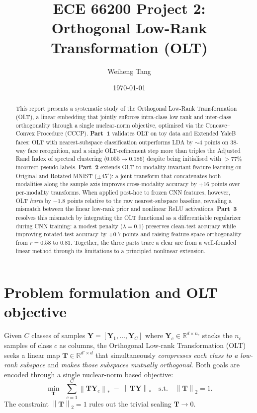 \documentclass[10pt]{article}
\title{ECE 66200 Project 2:\\
Orthogonal Low-Rank Transformation (OLT)}
\author{Weiheng Tang}
\date{\today}
\newcommand{\T}{\mathbf{T}}
\newcommand{\Y}{\mathbf{Y}}
\newcommand{\nuc}[1]{\left\|#1\right\|_{\ast}}
\newcommand{\spn}[1]{\left\|#1\right\|_{2}}
\begin{document}
\maketitle

\begin{abstract}
This report presents a systematic study of the Orthogonal Low-Rank
Transformation (OLT), a linear embedding that jointly enforces
intra-class low rank and inter-class orthogonality through a single
nuclear-norm objective, optimised via the Concave--Convex Procedure
(CCCP).
\textbf{Part~1} validates OLT on toy data and Extended YaleB faces:
OLT with nearest-subspace classification outperforms LDA by
$\sim\!4$ points on 38-way face recognition, and a single
OLT-refinement step more than triples the Adjusted Rand Index
of spectral clustering ($0.055\!\to\!0.186$) despite being
initialised with $>\!77\%$ incorrect pseudo-labels.
\textbf{Part~2} extends OLT to modality-invariant feature learning
on Original and Rotated MNIST ($\pm 45^\circ$): a joint transform
that concatenates both modalities along the sample axis improves
cross-modality accuracy by $+16$ points over per-modality transforms.
When applied post-hoc to frozen CNN features, however, OLT
\emph{hurts} by $-1.8$ points relative to the raw nearest-subspace
baseline, revealing a mismatch between the linear low-rank prior
and nonlinear ReLU activations.
\textbf{Part~3} resolves this mismatch by integrating the OLT
functional as a differentiable regularizer during CNN training:
a modest penalty ($\lambda\!=\!0.1$) preserves clean-test accuracy
while improving rotated-test accuracy by $+0.7$ points and raising
feature-space orthogonality from $r\!=\!0.58$ to $0.81$.
Together, the three parts trace a clear arc from a well-founded
linear method through its limitations to a principled nonlinear
extension.
\end{abstract}

\tableofcontents
\newpage

\section{Problem formulation and OLT objective}

Given $C$ classes of samples $\Y = [\Y_1,\dots,\Y_C]$ where $\Y_c \in
\mathbb{R}^{d\times n_c}$ stacks the $n_c$ samples of class $c$ as
columns, the Orthogonal Low-rank Transformation (OLT) seeks a linear
map $\T \in \mathbb{R}^{d'\times d}$ that simultaneously
\emph{compresses each class to a low-rank subspace} and \emph{makes
those subspaces mutually orthogonal}. Both goals are encoded through a
single nuclear-norm based objective:
\begin{equation}
\min_{\T}\;\;
\sum_{c=1}^{C}\nuc{\T \Y_c}\;-\;\nuc{\T \Y}
\quad\text{s.t.}\quad \spn{\T}=1.
\label{eq:olt}
\end{equation}
The constraint $\spn{\T}=1$ rules out the trivial scaling $\T\to 0$.
\end{document}
